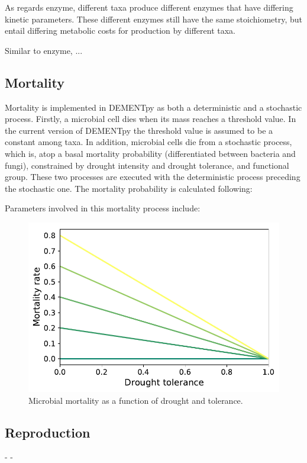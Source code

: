 \documentclass[12pt, oneside, titlepage]{article}      %
\begin{document}
As regards enzyme, different taxa produce different enzymes that have differing kinetic parameters. These different enzymes still have the same stoichiometry, but entail differing metabolic costs for production by different taxa. 

Similar to enzyme, ...

\subsection{Mortality}
Mortality is implemented in DEMENTpy as both a deterministic and a stochastic process. Firstly, a microbial cell dies when its mass reaches a threshold value. In the current version of DEMENTpy the threshold value is assumed to be a constant among taxa. In addition, microbial cells die from a stochastic process, which is, atop a basal mortality probability (differentiated between bacteria and fungi), constrained by drought intensity and drought tolerance, and functional group. These two processes are executed with the deterministic process preceding the stochastic one. The mortality probability is calculated following:

Parameters involved in this mortality process include:

\begin{figure}[H]
  \centering
  \includegraphics[width=\linewidth]{figures/Fig2_Microbial_mortality_prob.pdf}
  \caption{Microbial mortality as a function of drought and tolerance.}
  \label{fig:mortality}
\end{figure}


\subsection{Reproduction}
-
-
\end{document}
